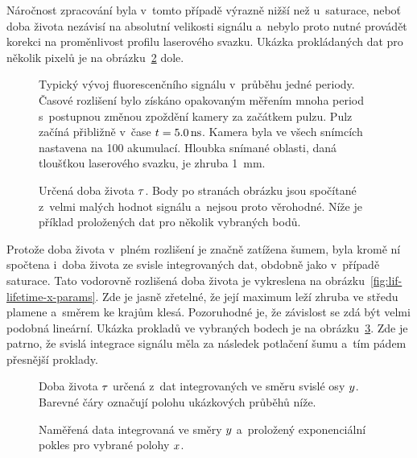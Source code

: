 Náročnost zpracování byla v~tomto případě výrazně nižší než u~saturace,
neboť doba života nezávisí na absolutní velikosti signálu
a~nebylo proto nutné provádět korekci na proměnlivost profilu
laserového svazku.
Ukázka prokládaných dat pro několik pixelů je
na obrázku~\ref{fig:lif-lifetime-full-params} dole.

\begin{figure}[p]
	\centering
	
	\caption{Typický vývoj fluorescenčního signálu v~průběhu jedné periody.
		Časové rozlišení bylo získáno opakovaným měřením mnoha period
		s~postupnou změnou zpoždění kamery za začátkem pulzu.
		Pulz začíná přibližně v~čase $t = \SI{5.0}{\nano\second}$.
		Kamera byla ve všech snímcích nastavena na \num{100} akumulací.
		Hloubka snímané oblasti, daná tloušťkou laserového svazku,
		je zhruba \SI{1}{\milli\metre}.}
	\label{fig:lif-timeev}
\end{figure}

\begin{figure}[htp]
	\centering
	
	
	\caption{Určená doba života $\tau$.
		Body po stranách obrázku jsou spočítané z~velmi malých hodnot
		signálu a~nejsou proto věrohodné.
		Níže je příklad proložených dat pro několik vybraných bodů.}
	\label{fig:lif-lifetime-full-params}
\end{figure}

Protože doba života v~plném rozlišení je značně zatížena šumem,
byla kromě ní spočtena i~doba života ze svisle integrovaných dat,
obdobně jako v~případě saturace.
Tato vodorovně rozlišená doba života je vykreslena
na obrázku~\ref{fig:lif-lifetime-x-params}.
Zde je jasně zřetelné, že její maximum leží zhruba ve středu plamene
a~směrem ke krajům klesá.
Pozoruhodné je, že závislost se zdá být velmi podobná lineární.
Ukázka prokladů ve vybraných bodech je
na obrázku~\ref{fig:lif-lifetime-x-fits}.
Zde je patrno, že svislá integrace signálu měla za následek potlačení šumu
a~tím pádem přesnější proklady.

\begin{figure}[htp]
	\centering
	
	\caption{Doba života $\tau$ určená z~dat integrovaných ve směru
		svislé osy $y$.
		Barevné čáry označují polohu ukázkových průběhů níže.}
	\label{fig:lif-lifetime-x-params}
	\bigskip
	
	\caption{Naměřená data integrovaná ve směry $y$ a~proložený
		exponenciální pokles pro vybrané polohy $x$.}
	\label{fig:lif-lifetime-x-fits}
\end{figure}

